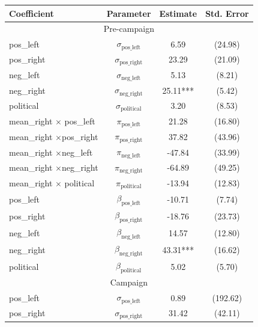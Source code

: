\documentclass[12pt]{article}
\begin{document}
	
	
	
	\begin{table}[ht]
		
		\centering
		\begin{threeparttable}
			
			\begin{tabular}{lccc}
				\hline
				\textbf{Coefficient} & \textbf{Parameter} & \textbf{Estimate} & \textbf{Std. Error} \\
				\hline
				\hline
				\multicolumn{4}{c}{{Pre-campaign}} \\
				\hline
				\hline
				pos\_left & $ \sigma_{\text{pos\_left}} $ & 6.59 & (24.98) \\
				pos\_right & $ \sigma_{\text{pos\_right}} $ & 23.29 & (21.09) \\
				neg\_left & $ \sigma_{\text{neg\_left}} $ & 5.13 & (8.21) \\
				neg\_right & $ \sigma_{\text{neg\_right}} $ & 25.11*** & (5.42) \\
				political & $ \sigma_{\text{political}} $ & 3.20 & (8.53) \\
				\hline
				mean\_right $\times $ pos\_left & $ \pi_{\text{pos\_left}} $ & 21.28 & (16.80) \\
				mean\_right $\times $pos\_right & $ \pi_{\text{pos\_right}} $ & 37.82 & (43.96) \\
				mean\_right $\times $neg\_left & $ \pi_{\text{neg\_left}} $ & -47.84 & (33.99) \\
				mean\_right $\times $neg\_right & $ \pi_{\text{neg\_right}} $ & -64.89 & (49.25) \\
				mean\_right $\times $ political & $ \pi_{\text{political}} $ & -13.94 & (12.83) \\
				\hline
				pos\_left & $ \beta_{\text{pos\_left}} $ & -10.71 & (7.74) \\
				pos\_right & $ \beta_{\text{pos\_right}} $ & -18.76 & (23.73) \\
				neg\_left & $ \beta_{\text{neg\_left}} $ & 14.57 & (12.80) \\
				neg\_right & $ \beta_{\text{neg\_right}} $ & 43.31*** & (16.62) \\
				political & $ \beta_{\text{political}} $ & 5.02 & (5.70) \\
				\hline
				\hline
				\multicolumn{4}{c}{{Campaign}} \\
				\hline
				\hline
				pos\_left & $ \sigma_{\text{pos\_left}} $ & 0.89 & (192.62) \\
				pos\_right & $ \sigma_{\text{pos\_right}} $ & 31.42 & (42.11) \\

\end{tabular}
\end{threeparttable}
\end{table}
\end{document}

